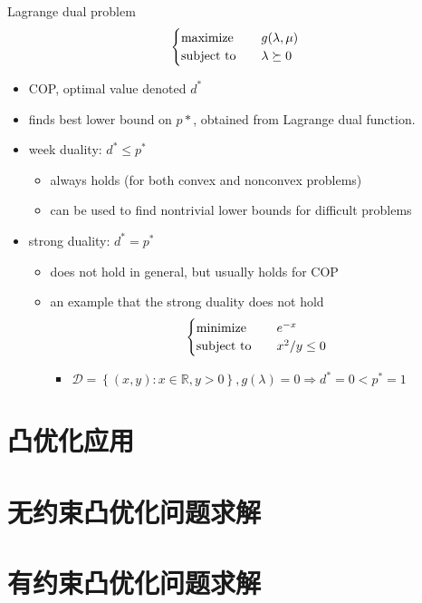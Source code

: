 \begin{remark}
    Lagrange dual problem\[\begin{cases}
        \operatorname{maximize} \quad &g(\lambda, \mu)\\
        \operatorname{subject\ to} \quad &\lambda \succeq 0
    \end{cases}\]
    \begin{itemize}
        \item COP, optimal value denoted $d^*$
        \item finds best lower bound on $p*$, obtained from Lagrange dual function.
        \item week duality: $d^* \le p^*$\begin{itemize}
            \item always holds (for both convex and nonconvex problems)
            \item can be used to find nontrivial lower bounds for difficult problems
        \end{itemize}
        \item strong duality: $d^* = p^*$\begin{itemize}
            \item does not hold in general, but usually holds for COP
            \item an example that the strong duality does not hold\[\begin{cases}
                \operatorname{minimize} \quad &e^{-x}\\
                \operatorname{subject\ to} \quad &x^2 / y \le 0
            \end{cases}\]\begin{itemize}
                \item $\mathcal{D} = \left\{(x, y): x \in \mathbb{R}, y > 0\right\}, g(\lambda) = 0 \Longrightarrow d^* = 0 < p^* = 1$
            \end{itemize}
        \end{itemize}
    \end{itemize}
\end{remark}



\section{凸优化应用}
\section{无约束凸优化问题求解}
\section{有约束凸优化问题求解}

